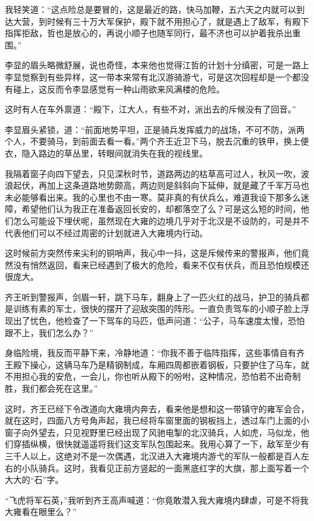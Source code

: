 我轻笑道：“这点险总是要冒的，这是最近的路，快马加鞭，五六天之内就可以到达大营，到时候有三十万大军保护，殿下就不用担心了，就是遇上了敌军，有殿下指挥拒敌，哲也是放心的，再说小顺子也随军同行，最不济也可以护着我杀出重围。”

李显的眉头略微舒展，说也奇怪，本来他也觉得江哲的计划十分缜密，可是一路上李显觉察到有些异样，这一带本来常有北汉游骑游弋，可是这次回程却是一个都没有碰上，这反而令李显感觉有一种山雨欲来风满楼的危险。

这时有人在车外禀道：“殿下，江大人，有些不对，派出去的斥候没有了回音。”

李显眉头紧锁，道：“前面地势平坦，正是骑兵发挥威力的战场，不可不防，派两个人，不要骑马，到前面去看一看。”两个齐王近卫下马，脱去沉重的铁甲，换上便衣，隐入路边的草丛里，转眼间就消失在我的视线里。

我隔着窗子向四下望去，只见深秋时节，道路两边的枯草高可过人，秋风一吹，波浪起伏，再加上这条道路地势颇高，两边则是斜斜向下延伸，就是藏了千军万马也未必能够看出来。我的心里也不由一寒。莫非真的有伏兵么，难道我设下那多么迷障，希望他们认为我正在准备返回长安的，却都落空了么？可是这么短的时间，他们怎么可能设下埋伏呢，虽然现在大雍的边境几乎对于北汉是不设防的，可是并不代表他们可以不经过周密的计划就进入大雍境内行动。

这时候前方突然传来尖利的铜哨声，我心中一抖，这是斥候传来的警报声，他们竟然没有悄然返回，看来已经遇到了极大的危险，看来不仅有伏兵，而且恐怕规模还很庞大。

齐王听到警报声，剑眉一轩，跳下马车，翻身上了一匹火红的战马，护卫的骑兵都是训练有素的军士，很快的摆开了迎敌突围的阵形。一直负责驾车的小顺子脸上浮现出了忧色，他检查了一下驾车的马匹，低声问道：“公子，马车速度太慢，恐怕跟不上，我们怎么办？”

身临险境，我反而平静下来，冷静地道：“你我不善于临阵指挥，这些事情自有齐王殿下操心，这辆马车乃是精钢制成，车厢四周都嵌着钢板，只要护住了马车，就不用担心我的安危，一会儿，你也听从殿下的吩咐，这种情况，恐怕若不出奇制胜，我们都会死在这里。”

这时，齐王已经下令改道向大雍境内奔去，看来他是想和这一带镇守的雍军会合，就在这时，四面八方号角声起，我已经将车窗里面的钢板挡上，透过车门上面的小窗子向外望去，只见视野里已经出现了风驰电掣的北汉骑兵，人如虎，马似龙，他们穿插纵横，很快就遥遥将我们这支军队包围起来。我用心算了一下，敌军至少有三千人以上，这绝对不是一次偶遇，北汉进入大雍境内游弋的军队一般都是百人左右的小队骑兵。这时，我看见正前方竖起的一面黑底红字的大旗，那上面写着一个大大的“石”字。

“飞虎将军石英，”我听到齐王高声喊道：“你竟敢潜入我大雍境内肆虐，可是不将我大雍看在眼里么？”

